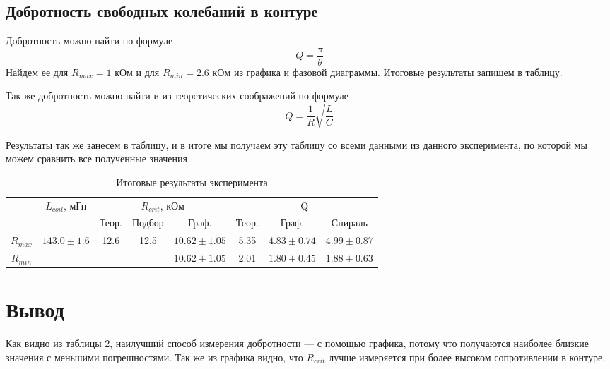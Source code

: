 \documentclass[a4paper,12pt]{article} %
\begin{document}
\subsection*{Добротность свободных колебаний в контуре}
Добротность можно найти по формуле 
\[Q = \dfrac{\pi}{\theta}\]
Найдем ее для $R_{max} = 1$ кОм и для $R_{min} = 2.6$ кОм из графика и фазовой диаграммы. Итоговые результаты запишем в таблицу.

Так же добротность можно найти и из теоретических соображений по формуле
\[Q = \dfrac{1}{R}\sqrt{\dfrac{L}{C}}\]

Результаты так же занесем в таблицу, и в итоге мы получаем эту таблицу со всеми данными из данного эксперимента, по которой мы можем сравнить все полученные значения

\begin{table}[h!]
\begin{center}
\begin{tabular}{|c|c|c|c|c|c|c|c|}
\hline
\multirow{2}{*}{} & \multirow{2}{*}{$L_{coil}$, мГн} & \multicolumn{3}{c|}{$R_{crit}$, кОм}                         & \multicolumn{3}{c|}{Q}                 \\ \cline{3-8} 
                  &                                  & Теор.                 & Подбор              & Граф.          & Теор. & Граф.         & Спираль        \\ \hline
$R_{max}$         & \multirow{2}{*}{$143.0 \pm 1.6$}   & \multirow{2}{*}{12.6} & \multirow{2}{*}{12.5} & $10.62 \pm 1.05$ & 5.35   & $4.83 \pm 0.74$ & $4.99 \pm 0.87$  \\ \cline{1-1} \cline{5-8} 
$R_{min}$         &                                  &                       &                     & $10.62 \pm 1.05$ & 2.01   & $1.80 \pm 0.45$ & $1.88 \pm 0.63$ \\ \hline
\end{tabular}
\caption{Итоговые результаты эксперимента}
\end{center}
\end{table}
\section*{Вывод}
Как видно из таблицы 2, наилучший способ измерения добротности --- с помощью графика, потому что получаются наиболее близкие значения с меньшими погрешностями. Так же из графика видно, что $R_{crit}$ лучше измеряется при более высоком сопротивлении в контуре. 
\end{document}
